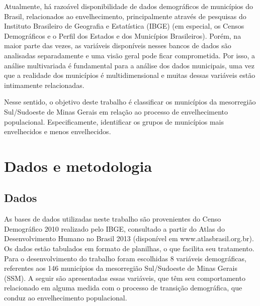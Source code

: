\documentclass[10pt,twoside]{article}
\begin{document}
Atualmente, há razoável disponibilidade de dados demográficos de municípios do Brasil, relacionados ao envelhecimento, principalmente através de pesquisas do Instituto Brasileiro de Geografia e Estatística (IBGE) (em especial, os Censos Demográficos e o Perfil dos Estados e dos Municípios Brasileiros). Porém, na maior parte das vezes, as variáveis disponíveis nesses bancos de dados são analisadas separadamente e uma visão geral pode ficar comprometida. Por isso, a análise multivariada é fundamental para a análise dos dados municipais, uma vez que a realidade dos municípios é multidimensional e muitas dessas variáveis estão intimamente relacionadas. 

Nesse sentido, o objetivo deste trabalho é classificar os municípios da mesorregião Sul/Sudoeste de Minas Gerais em relação ao processo de envelhecimento populacional. Especificamente, identificar os grupos de municípios mais envelhecidos e menos envelhecidos. 



\medskip
	
\section{Dados e metodologia}
\medskip

\subsection{Dados}

As bases de dados utilizadas neste trabalho são provenientes do Censo Demográfico 2010 realizado pelo IBGE, consultado a partir do Atlas do Desenvolvimento Humano no Brasil 2013 (disponível em www.atlasbrasil.org.br). Os dados estão tabulados em formato de planilhas, o que facilita seu tratamento. Para o desenvolvimento do trabalho foram escolhidas 8 variáveis demográficas, referentes aos 146 municípios da mesorregião Sul/Sudoeste de Minas Gerais (SSM). A seguir são apresentadas essas variáveis, que têm seu comportamento relacionado em alguma medida com o processo de transição demográfica, que conduz ao envelhecimento populacional.

\end{document}

